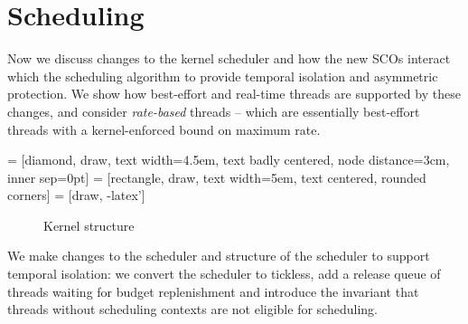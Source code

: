 
\section{Scheduling}

Now we discuss changes to the kernel scheduler and how the new \glspl{SCO} interact which the
scheduling algorithm to provide temporal isolation and asymmetric protection.
We show how best-effort and real-time threads are supported by these changes, and consider \emph{rate-based} threads -- which are essentially best-effort threads with a kernel-enforced bound on maximum rate.


 = [diamond, draw,
    text width=4.5em, text badly centered, node distance=3cm, inner sep=0pt]
 = [rectangle, draw,
    text width=5em, text centered, rounded corners]
 = [draw, -latex']


\begin{figure}
\caption{Kernel structure}
\label{figure:tickless}
\end{figure}

We make changes to the scheduler and structure of the scheduler to support temporal isolation: we
convert the scheduler to tickless, add a release queue of threads waiting for budget replenishment
and introduce the invariant that threads without scheduling contexts are not eligible for
scheduling.

